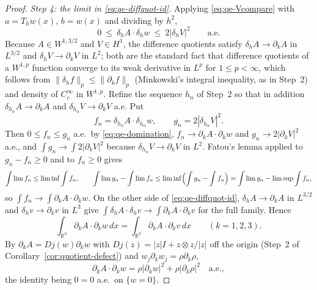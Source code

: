 \documentclass[11pt]{article}
\theoremstyle{definition}
\theoremstyle{plain}
\newcommand{\R}{\mathbb R}
\newcommand{\norm}[1]{\lVert #1\rVert}
\begin{document}
\begin{proof}
\emph{Step 4: the limit in \eqref{eq:qe-diffquot-id}.}  Applying
\eqref{eq:qe-Vcompare} with $a=T_hw(x)$, $b=w(x)$ and dividing by $h^2$,
\begin{equation}\label{eq:qe-domination}
 0\ \le\ \delta_hA\cdot\delta_hw\ \le\ 2|\delta_hV|^2\qquad\text{a.e.}
\end{equation}
Because $A\in W^{1,3/2}$ and $V\in H^1$, the difference quotients satisfy
$\delta_hA\to\partial_kA$ in $L^{3/2}$ and $\delta_hV\to\partial_kV$ in
$L^2$; both are the standard fact that difference quotients of a
$W^{1,p}$ function converge to its weak derivative in $L^p$ for
$1\le p<\infty$, which follows from
$\norm{\delta_hf}_p\le\norm{\partial_kf}_p$ (Minkowski's integral
inequality, as in Step~2) and density of $C_c^\infty$ in $W^{1,p}$.
Refine the sequence $h_n$ of Step~2 so that in addition
$\delta_{h_n}A\to\partial_kA$ and $\delta_{h_n}V\to\partial_kV$ a.e.  Put
\[
 f_n=\delta_{h_n}A\cdot\delta_{h_n}w,
 \qquad
 g_n=2|\delta_{h_n}V|^2 .
\]
Then $0\le f_n\le g_n$ a.e.\ by \eqref{eq:qe-domination}, $f_n\to
\partial_kA\cdot\partial_kw$ and $g_n\to2|\partial_kV|^2$ a.e., and
$\int g_n\to\int2|\partial_kV|^2$ because $\delta_{h_n}V\to\partial_kV$ in
$L^2$.  Fatou's lemma applied to $g_n-f_n\ge0$ and to $f_n\ge0$ gives
\[
 \int\lim f_n\le\liminf\int f_n,
 \qquad
 \int\lim g_n-\int\lim f_n\le\liminf\Bigl(\int g_n-\int f_n\Bigr)
 =\int\lim g_n-\limsup\int f_n,
\]
so $\int f_n\to\int\partial_kA\cdot\partial_kw$.  On the other side of
\eqref{eq:qe-diffquot-id}, $\delta_hA\to\partial_kA$ in $L^{3/2}$ and
$\delta_hv\to\partial_kv$ in $L^3$ give
$\int\delta_hA\cdot\delta_hv\to\int\partial_kA\cdot\partial_kv$ for the
full family.  Hence
\begin{equation}\label{eq:qe-weighted-component}
 \int_{\R^3}\partial_kA\cdot\partial_kw\,dx
 =\int_{\R^3}\partial_kA\cdot\partial_kv\,dx
 \qquad(k=1,2,3).
\end{equation}
By $\partial_kA=Dj(w)\partial_kw$ with
$Dj(z)=|z|I+z\otimes z/|z|$ off the origin
(Step~2 of Corollary~\ref{cor:quotient-defect}) and
$w_j\partial_kw_j=\rho\partial_k\rho$,
\[
 \partial_kA\cdot\partial_kw
 =\rho|\partial_kw|^2+\rho|\partial_k\rho|^2\quad\text{a.e.},
\]
the identity being $0=0$ a.e.\ on $\{w=0\}$.


\end{proof}
\end{document}
